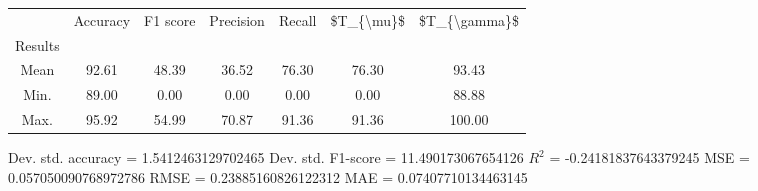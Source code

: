 \begin{tabular}{|c|c|c|c|c|c|c|}
\toprule
{} &  Accuracy &  F1 score &  Precision &  Recall &  \$T\_\{\textbackslash mu\}\$ &  \$T\_\{\textbackslash gamma\}\$ \\
Results &           &           &            &         &            &               \\
\hline
Mean    &     92.61 &     48.39 &      36.52 &   76.30 &      76.30 &         93.43 \\
Min.    &     89.00 &      0.00 &       0.00 &    0.00 &       0.00 &         88.88 \\
Max.    &     95.92 &     54.99 &      70.87 &   91.36 &      91.36 &        100.00 \\
\bottomrule
\end{tabular}

 Dev. std. accuracy = 1.5412463129702465
 Dev. std. F1-score = 11.490173067654126
 $R^2$ = -0.24181837643379245
 MSE = 0.057050090768972786
 RMSE = 0.23885160826122312
 MAE = 0.07407710134463145